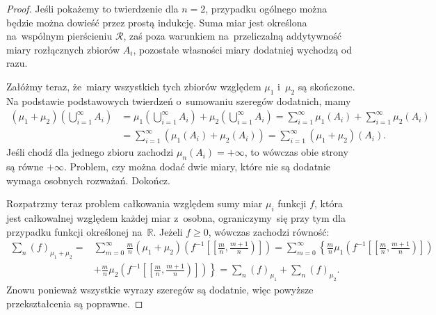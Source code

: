 \documentclass[a4paper,11pt]{article}
\newcommand{\fr}{\frac}
\newcommand{\mb}{\mathbb}
\newcommand{\mc}{\mathcal}
\newcommand{\R}{\mb{R}}
\newcommand{\Rc}{\mc{R}}
\newcommand{\Sum}{\sum\limits}
\newcommand{\Dok}{{\color{red} Dokończ.}}
\begin{document}
\begin{proof}
  Jeśli pokażemy to twierdzenie dla $n = 2$, przypadku ogólnego można
  będzie można dowieść przez prostą indukcję. Suma miar jest określona
  na~wspólnym pierścieniu $\Rc$, zaś poza warunkiem na~przeliczalną
  addytywność miary rozłącznych zbiorów $A_{ i }$, pozostałe własności
  miary dodatniej wychodzą od razu.

  Załóżmy teraz, że~miary wszystkich tych zbiorów względem $\mu_{ 1 }$
  i~$\mu_{ 2 }$ są skończone. Na podstawie podstawowych twierdzeń
  o~sumowaniu szeregów dodatnich, mamy
  \begin{equation*}
    \begin{split}
      (\mu_{ 1 } + \mu_{ 2 })\left( \bigcup_{ i = 1 }^{ \infty } A_{ i
        } \right) &= \mu_{ 1 }\left( \bigcup_{ i = 1 }^{ \infty } A_{
          i } \right) + \mu_{ 2 }\left( \bigcup_{ i = 1 }^{ \infty }
        A_{ i } \right) = \sum_{ i = 1 }^{ \infty } \mu_{ 1 }( A_{ i }
      )
      + \sum_{ i = 1 }^{ \infty } \mu_{ 2 }( A_{ i } ) \\
      &= \sum_{ i = 1 }^{ \infty } ( \mu_{ 1 }( A_{ i } ) + \mu_{ 2 }(
      A_{ i } ) ) = \sum_{ i = 1 }^{ \infty } ( \mu_{ 1 } + \mu_{ 2 }
      )( A_{ i } ).
    \end{split}
  \end{equation*}
  Jeśli chodź dla jednego zbioru zachodzi
  $\mu_{ n }( A_{ i } ) = +\infty$, to wówczas obie strony są równe
  $+\infty$. Problem, czy można dodać dwie miary, które nie są
  dodatnie wymaga osobnych rozważań. \Dok

  Rozpatrzmy teraz problem całkowania względem sumy miar $\mu_{ i }$
  funkcji $f$, która jest całkowalnej względem każdej miar z~osobna,
  ograniczymy~się przy tym dla przypadku funkcji określonej na~$\R$.
  Jeżeli $f \geq 0$, wówczas zachodzi równość:
  \begin{equation}
    \label{eq:RSI2}
    \begin{split}
      \sum_{ n }( f )_{ \mu_{ 1 } + \mu_{ 2 } } =& \Sum_{ m = 0 }^{
        \infty } \fr{ m }{ n } ( \mu_{ 1 } + \mu_{ 2 } )\left( f^{ -1
        }\left[ \left[ \fr{ m }{ n }, \fr{ m + 1 }{ n } \right)
        \right] \right) = \Sum_{ m = 0 }^{ \infty } \left\{ \fr{ m }{
          n } \mu_{ 1 }\left( f^{ -1 }\left[ \left[ \fr{ m }{ n },
              \fr{ m + 1 }{ n } \right) \right] \right) \right. \\
      &+ \left. \fr{ m }{ n } \mu_{ 2 }\left( f^{ -1 }\left[ \left[
              \fr{ m }{ n }, \fr{ m + 1 }{ n } \right) \right] \right)
      \right\} = \Sum_{ n }( f )_{ \mu_{ 1 } } + \Sum_{ n }( f )_{
        \mu_{ 2 } }.
    \end{split}
  \end{equation}
  Znowu ponieważ wszystkie wyrazy szeregów są dodatnie, więc powyższe
  przekształcenia są poprawne.


\end{proof}
\end{document}
